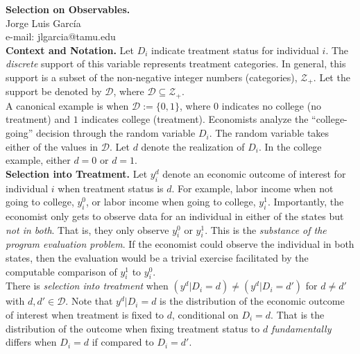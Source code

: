 
\let\counterwithout\relax
\let\counterwithin\relax
{}



\onehalfspacing
\noindent \textbf{Selection on Observables.}\\
\noindent Jorge Luis García \\
\noindent e-mail: jlgarcia@tamu.edu\\

\noindent \textbf{Context and Notation.} Let $D_i$ indicate treatment status for individual $i$. The \textit{discrete} support of this variable represents treatment categories. In general, this support is a subset of the non-negative integer numbers (categories), $\mathcal{Z}_{+}$. Let the support be denoted by $\mathcal{D}$, where $\mathcal{D} \subseteq \mathcal{Z}_{+}$.\\

\noindent A canonical example is when $\mathcal{D}:= \{ 0,1 \}$, where $0$ indicates no college (no treatment) and $1$ indicates college (treatment). Economists analyze the ``college-going'' decision through the random variable $D_i$. The random variable takes either of the values in $\mathcal{D}$. Let $d$ denote the realization of $D_i$. In the college example, either $d = 0$ or $d = 1$.\\

\noindent \textbf{Selection into Treatment.} Let $y_{i}^d$ denote an economic outcome of interest for individual $i$ when treatment status is $d$. For example, labor income when not going to college, $y_{i}^0$, or labor income when going to college, $y_{i}^1$. Importantly, the economist only gets to observe data for an individual in either of the states but \textit{not in both}. That is, they only observe $y_{i}^0$ or $y_{i}^1$. This is the \textit{substance of the program evaluation problem}. If the economist could observe the individual in both states, then the evaluation would be a trivial exercise facilitated by the computable comparison of $y_{i}^1$ to $y_{i}^0$.\\

\noindent There is \textit{selection into treatment} when $\left( y^{d} | D_i = d \right) \neq \left( y^{d} | D_i = d' \right) $ for $d \neq d'$ with $d, d' \in \mathcal{D}$. Note that  $y^{d} | D_i = d$ is the distribution of the economic outcome of interest when treatment is fixed to $d$, conditional on $D_i = d$. That is the distribution of the outcome when fixing treatment status to $d$ \textit{fundamentally} differs when $D_i = d$ if compared to $D_i = d'$.\\ 

